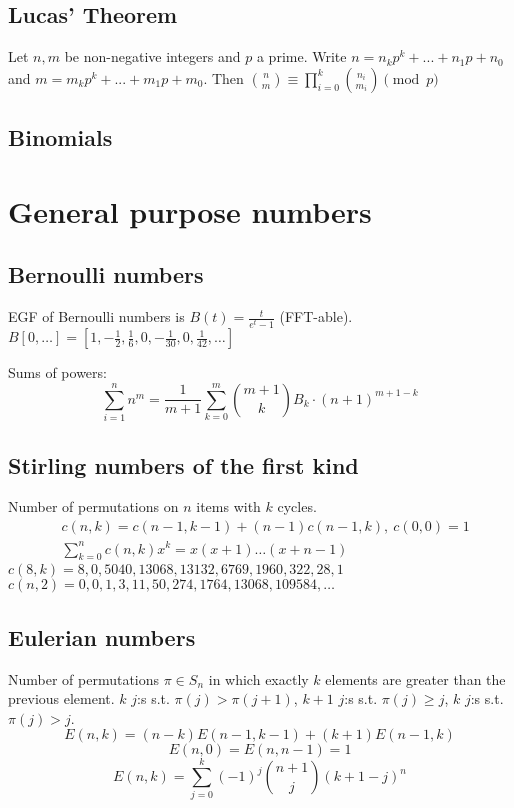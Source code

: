 	\subsection{Lucas' Theorem}
		Let $n,m$ be non-negative integers and $p$ a prime. Write $n=n_kp^k+...+n_1p+n_0$ and $m=m_kp^k+...+m_1p+m_0$. Then $\binom{n}{m} \equiv \prod_{i=0}^k\binom{n_i}{m_i} \pmod{p}$ \newline

	\subsection{Binomials}

\section{General purpose numbers}
	\subsection{Bernoulli numbers}
		EGF of Bernoulli numbers is $B(t)=\frac{t}{e^t-1}$ (FFT-able).
		$B[0,\ldots] = [1, -\frac{1}{2}, \frac{1}{6}, 0, -\frac{1}{30}, 0, \frac{1}{42}, \ldots]$

		Sums of powers:
		\small
		\[ \sum_{i=1}^n n^m = \frac{1}{m+1} \sum_{k=0}^m \binom{m+1}{k} B_k \cdot (n+1)^{m+1-k} \]
		\normalsize

	\subsection{Stirling numbers of the first kind}
		Number of permutations on $n$ items with $k$ cycles.
		\begin{align*}
			&c(n,k) = c(n-1,k-1) + (n-1) c(n-1,k),\ c(0,0) = 1 \\
			&\textstyle \sum_{k=0}^n c(n,k)x^k = x(x+1) \dots (x+n-1)
		\end{align*}
		$c(8,k) = 8, 0, 5040, 13068, 13132, 6769, 1960, 322, 28, 1$ \\
		$c(n,2) = 0, 0, 1, 3, 11, 50, 274, 1764, 13068, 109584, \dots$

	\subsection{Eulerian numbers}
		Number of permutations $\pi \in S_n$ in which exactly $k$ elements are greater than the previous element. $k$ $j$:s s.t. $\pi(j)>\pi(j+1)$, $k+1$ $j$:s s.t. $\pi(j)\geq j$, $k$ $j$:s s.t. $\pi(j)>j$.
		$$E(n,k) = (n-k)E(n-1,k-1) + (k+1)E(n-1,k)$$
		$$E(n,0) = E(n,n-1) = 1$$
		$$E(n,k) = \sum_{j=0}^k(-1)^j\binom{n+1}{j}(k+1-j)^n$$

